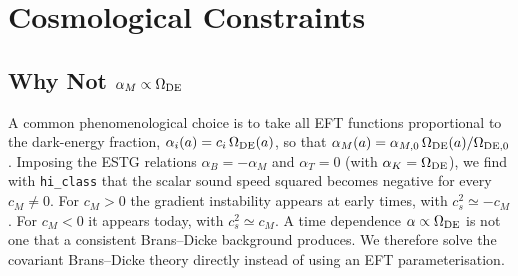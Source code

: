 \documentclass[11pt,a4paper]{article}
\begin{document}
\section{Cosmological Constraints}

\subsection{\texorpdfstring{Why Not $\alpha_M \propto \Omega_{\rm DE}$}{Why Not alpha_M proportional to Omega_DE}}
\label{sec:propto}
A common phenomenological choice is to take all EFT functions proportional to the dark-energy fraction, $\alpha_i(a) = c_i\, \Omega_{\rm DE}(a)$, so that $\alpha_M(a) = \alpha_{M,0}\,\Omega_{\rm DE}(a)/\Omega_{\rm DE,0}$. Imposing the ESTG relations $\alpha_B = -\alpha_M$ and $\alpha_T = 0$ (with $\alpha_K = \Omega_{\rm DE}$), we find with \texttt{hi\_class} that the scalar sound speed squared becomes negative for every $c_M \neq 0$. For $c_M > 0$ the gradient instability appears at early times, with $c_s^2 \simeq -c_M$. For $c_M < 0$ it appears today, with $c_s^2 \simeq c_M$. A time dependence $\alpha \propto \Omega_{\rm DE}$ is not one that a consistent Brans--Dicke background produces. We therefore solve the covariant Brans--Dicke theory directly instead of using an EFT parameterisation.
\end{document}
